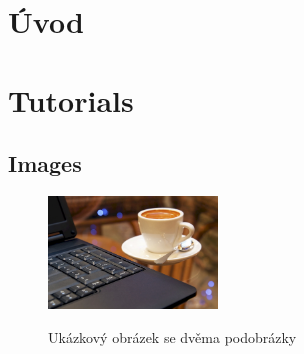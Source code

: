 \documentclass[czech,master,dept460,male,cpp,cpdeclaration]{diploma}
\begin{document}
\MakeTitlePages

\section{Úvod}
\label{sec:Introduction}

\section{Tutorials}

\subsection{Images}

\begin{figure}
  \centering
  \includegraphics[width=0.4\textwidth]{Figures/CoffeeAndComputer.jpg}
\end{figure}

\begin{figure}
  \centering
  \hspace{3em} %
  \caption{Ukázkový obrázek se dvěma podobrázky}
  \label{fig:TopLevelFigureLabel}
\end{figure}
\end{document}
